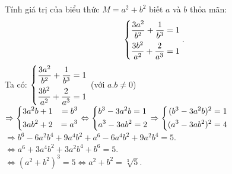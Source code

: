 \begin{ex}%
    Tính giá trị của biểu thức $M=a^2+b^2$ biết $a$ và $b$ thỏa mãn:
    \[\left\{\begin{aligned}&\dfrac{3a^2}{b^2}+\dfrac{1}{b^3}=1\\
    &\dfrac{3b^2}{a^2}+\dfrac{2}{a^3}=1\end{aligned}\right..\]
\loigiai
    {Ta có: $\left\{\begin{aligned}&\dfrac{3a^2}{b^2}+\dfrac{1}{b^3}=1\\
    		&\dfrac{3b^2}{a^2}+\dfrac{2}{a^3}=1\end{aligned}\right.$ (với $a.b\ne0$)\\
    	$\Rightarrow \left\{\begin{aligned}&3a^2b+1&=b^3\\&3ab^2+2&=a^3\end{aligned}\right.\Leftrightarrow\left\{\begin{aligned}&b^3-3a^2b=1\\&a^3-3ab^2=2\end{aligned}\right.\Rightarrow\left\{\begin{aligned}(b^3-3a^2b)^2=1\\(a^3-3ab^2)^2=4\end{aligned}\right.$\\
    	$\Rightarrow b^6-6a^2b^4+9a^4b^2+a^6-6a^4b^2+9a^2b^4=5$.\\
    	$\Leftrightarrow a^6+3a^4b^2+3a^2b^4+b^6=5$.\\
    	$\Leftrightarrow (a^2+b^2)^3=5\Leftrightarrow a^2+b^2=\sqrt[3]{5}$.
    }
\end{ex}
